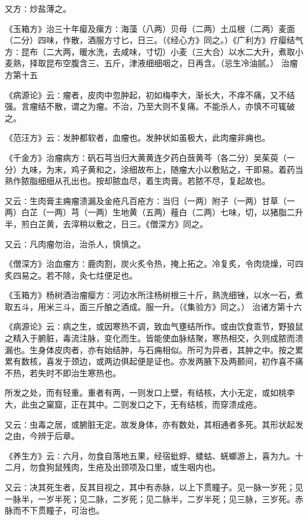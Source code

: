 \documentclass[a4paper,12pt,UTF8,twoside]{ctexbook}
\begin{document}
又方∶炒盐薄之。

《玉箱方》治三十年瘿及瘰方∶海藻（八两）贝母（二两）土瓜根（二两）麦面（二分）四味，作散，酒服方寸匕，日三。（《经心方》同之。）《广利方》疗瘿结气方∶昆布（二大两，暖水洗，去咸味，寸切）小麦（三大合）以水二大升，煮取小麦熟，择取昆布空腹含三、五斤，津液细细咽之，日再含。（忌生冷油腻。）
治瘤方第十五

《病源论》云∶瘤者，皮肉中忽肿起，初如梅李大，渐长大，不痒不痛，又不结强。言瘤结不散，谓之为瘤。不治，乃至大则不复痛。不能杀人，亦慎不可辄破之。

《范汪方》云∶发肿都软者，血瘤也。发肿状如虽极大，此肉瘤非痈也。

《千金方》治瘤病方∶矾石芎当归大黄黄连夕药白蔹黄芩（各二分）吴茱萸（一分）九味，为末，鸡子黄和之，涂细故布上，随瘤大小以敷贴之，干即易。着药当熟作脓脂细细从孔出也。按却脓血尽，着生肉膏。若脓不尽，复起故也。

又云∶生肉膏主痈瘤溃漏及金疮凡百疮方∶当归（一两）附子（一两）甘草（一两）白芷（一两）芎（一两）生地黄（五两）薤白（二两）七味，切，以猪脂二升半，煎白芷黄，去滓稍以敷之，日三。《僧深方》同之。

又云∶凡肉瘤勿治，治杀人，慎慎之。

《僧深方》治血瘤方∶鹿肉割，炭火炙令热，掩上拓之。冷复炙，令肉烧燥，可四炙四易之。若不除，灸七炷便足也。

《玉箱方》杨树酒治瘤瘿方∶河边水所注杨树根三十斤，熟洗细锉，以水一石，煮取五斗，用米三斗，面三斤酿之酒成。服一升。（《集验方》同之。）
治诸方第十六

《病源论》云∶病之生，或因寒热不调，致血气壅结所作。或由饮食乖节，野狼鼠之精入于腑脏，毒流注脉，变化而生。皆能使血脉结聚，寒热相交，久则成脓而溃漏也。生身体皮肉者，亦有始结肿，与石痈相似。所可为异者，其肿之中。按之累累有数核，喜发于颈边，或两边俱起便是证也。亦发两腋下及两颞间，初作喜不痛不热，若失时不即治生寒热也。

所发之处，而有轻重。重者有两，一则发口上壁，有结核，大小无定，或如桃李大，此虫之窠窟，正在其中。二则发口之下，无有结核，而穿溃成疮。

又云∶虫毒之居，或腑脏无定。故发身体，亦有数处，其相通者多死。其形状起发之由，今辨于后章。

《养生方》云∶六月，勿食自落地五果，经宿蚍蜉、蝼蛄、蜣螂游上，喜为九。十二月，勿食狗鼠残肉，生疮及出颈项及口里，或生咽内也。

又云∶决其死生者，反其目视之，其中有赤脉，以上下贯瞳子。见一脉一岁死；见一脉半，一岁半死；见二脉，二岁死；见二脉半，二岁半死；见三脉，三岁死。赤脉而不下贯瞳子，可治也。
\end{document}
